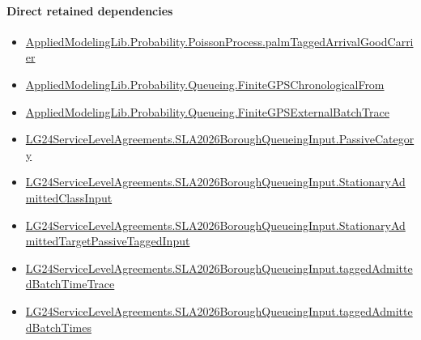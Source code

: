 \documentclass[10pt]{article}
\begin{document}
\paragraph{Direct retained dependencies}
\begin{itemize}\raggedright
\item \hyperlink{governing-declaration-ae13476c571ece6d}{Applied\allowbreak{}Modeling\allowbreak{}Lib.\allowbreak{}Probability.\allowbreak{}Poisson\allowbreak{}Process.\allowbreak{}palm\allowbreak{}Tagged\allowbreak{}Arrival\allowbreak{}Good\allowbreak{}Carrier}
\item \hyperlink{governing-declaration-b377d5b73c0b2dcb}{Applied\allowbreak{}Modeling\allowbreak{}Lib.\allowbreak{}Probability.\allowbreak{}Queueing.\allowbreak{}Finite\allowbreak{}GPS\allowbreak{}Chronological\allowbreak{}From}
\item \hyperlink{governing-declaration-e4b34708a4789d6f}{Applied\allowbreak{}Modeling\allowbreak{}Lib.\allowbreak{}Probability.\allowbreak{}Queueing.\allowbreak{}Finite\allowbreak{}GPS\allowbreak{}External\allowbreak{}Batch\allowbreak{}Trace}
\item \hyperlink{governing-declaration-abc91e26948cf0a3}{LG24\allowbreak{}Service\allowbreak{}Level\allowbreak{}Agreements.\allowbreak{}SLA2026\allowbreak{}Borough\allowbreak{}Queueing\allowbreak{}Input.\allowbreak{}Passive\allowbreak{}Category}
\item \hyperlink{governing-declaration-f3072ff54a3653c2}{LG24\allowbreak{}Service\allowbreak{}Level\allowbreak{}Agreements.\allowbreak{}SLA2026\allowbreak{}Borough\allowbreak{}Queueing\allowbreak{}Input.\allowbreak{}Stationary\allowbreak{}Admitted\allowbreak{}Class\allowbreak{}Input}
\item \hyperlink{governing-declaration-8796a25a610eaea9}{LG24\allowbreak{}Service\allowbreak{}Level\allowbreak{}Agreements.\allowbreak{}SLA2026\allowbreak{}Borough\allowbreak{}Queueing\allowbreak{}Input.\allowbreak{}Stationary\allowbreak{}Admitted\allowbreak{}Target\allowbreak{}Passive\allowbreak{}Tagged\allowbreak{}Input}
\item \hyperlink{governing-declaration-a7752e25c2ce57df}{LG24\allowbreak{}Service\allowbreak{}Level\allowbreak{}Agreements.\allowbreak{}SLA2026\allowbreak{}Borough\allowbreak{}Queueing\allowbreak{}Input.\allowbreak{}tagged\allowbreak{}Admitted\allowbreak{}Batch\allowbreak{}Time\allowbreak{}Trace}
\item \hyperlink{governing-declaration-c80980eaa95ab5a1}{LG24\allowbreak{}Service\allowbreak{}Level\allowbreak{}Agreements.\allowbreak{}SLA2026\allowbreak{}Borough\allowbreak{}Queueing\allowbreak{}Input.\allowbreak{}tagged\allowbreak{}Admitted\allowbreak{}Batch\allowbreak{}Times}
\end{itemize}
\hypertarget{governing-declaration-15319024241977b5}{}
\end{document}
